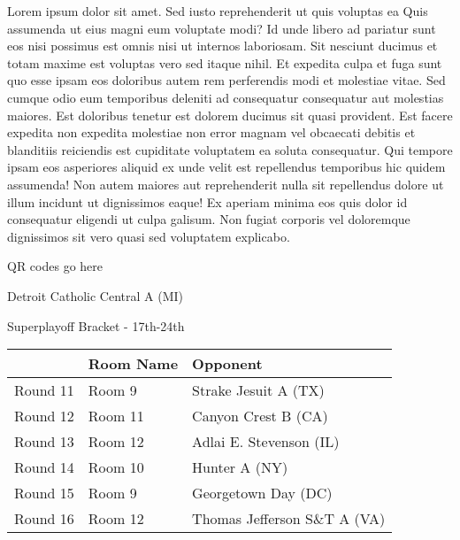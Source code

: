 \documentclass{article}%
\begin{document}
\vspace*{8pt}%
\linebreak%
\newline%
\newline%
    Lorem ipsum dolor sit amet. Sed iusto reprehenderit ut quis voluptas ea Quis assumenda ut eius magni eum voluptate modi? Id unde libero ad pariatur sunt eos nisi possimus est omnis nisi ut internos laboriosam. Sit nesciunt ducimus et totam maxime est voluptas vero sed itaque nihil. Et expedita culpa et fuga sunt quo esse ipsam eos doloribus autem rem perferendis modi et molestiae vitae.\newline%
\newline%
    Sed cumque odio eum temporibus deleniti ad consequatur consequatur aut molestias maiores. Est doloribus tenetur est dolorem ducimus sit quasi provident. Est facere expedita non expedita molestiae non error magnam vel obcaecati debitis et blanditiis reiciendis est cupiditate voluptatem ea soluta consequatur. Qui tempore ipsam eos asperiores aliquid ex unde velit est repellendus temporibus hic quidem assumenda!\newline%
\newline%
    Non autem maiores aut reprehenderit nulla sit repellendus dolore ut illum incidunt ut dignissimos eaque! Ex aperiam minima eos quis dolor id consequatur eligendi ut culpa galisum. Non fugiat corporis vel doloremque dignissimos sit vero quasi sed voluptatem explicabo.\newline%
\newline%
\vspace*{30pt}%
\begin{center}%
\begin{Huge}%
QR codes go here%
\end{Huge}%
\end{center}%
\newpage%
\begin{center}%
\begin{Huge}%
Detroit Catholic Central A (MI)%
\end{Huge}%
\vspace*{8pt}%
\linebreak%
\begin{Large}%
Superplayoff Bracket {-} 17th{-}24th%
\end{Large}%
\end{center}%
%
\begin{tabularx}{\textwidth}{|c|Y|Y|}%
\hline%
&Room Name&Opponent\\%
\hline%
Round 11&Room 9&Strake Jesuit A (TX)\\%
Round 12&Room 11&Canyon Crest B (CA)\\%
Round 13&Room 12&Adlai E. Stevenson (IL)\\%
Round 14&Room 10&Hunter A (NY)\\%
Round 15&Room 9&Georgetown Day (DC)\\%
Round 16&Room 12&Thomas Jefferson S\&T A (VA)\\%
\hline%
\end{tabularx}%
\end{document}
